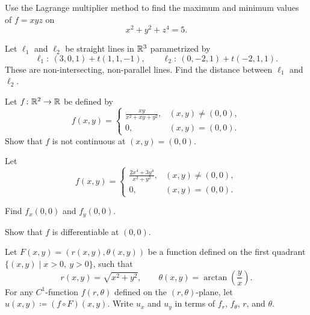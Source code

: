 \begin{problem}
Use the Lagrange multiplier method to find the maximum and minimum values of $f=xyz$ on
\[
x^2+y^2+z^4=5.
\]
\end{problem}

\begin{problem}
Let $\ell_1$ and $\ell_2$ be straight lines in $\mathbb{R}^3$ parametrized by
\[
\ell_1:\ (3, 0, 1)+t(1, 1, -1),
\qquad
\ell_2:\ (0, -2, 1)+t(-2, 1, 1).
\]
These are non-intersecting, non-parallel lines. Find the distance between $\ell_1$ and $\ell_2$.
\end{problem}

\begin{problem}
Let $f\colon\mathbb{R}^2\to\mathbb{R}$ be defined by
\[
f(x, y)=
\begin{cases}
\displaystyle\frac{xy}{x^2+xy+y^2}, & (x, y)\ne(0, 0), \\[0.55em]
0, & (x, y)=(0, 0).
\end{cases}
\]
Show that $f$ is not continuous at $(x, y)=(0, 0)$.
\end{problem}

\begin{problem}
Let
\[
f(x, y)=
\begin{cases}
\displaystyle\frac{2x^4+3y^4}{x^2+y^2}, & (x, y)\ne(0, 0), \\[0.55em]
0, & (x, y)=(0, 0).
\end{cases}
\]
\begin{problemsubparts}
\item Find $f_x(0, 0)$ and $f_y(0, 0)$.
\item Show that $f$ is differentiable at $(0, 0)$.
\end{problemsubparts}
\end{problem}

\begin{problem}
Let $F(x, y)=(r(x, y), \theta(x, y))$ be a function defined on the first quadrant $\{(x, y)\mid x>0,\ y>0\}$, such that
\[
r(x, y)=\sqrt{x^2+y^2},
\qquad
\theta(x, y)=\arctan\!\left(\frac{y}{x}\right).
\]
For any $C^1$-function $f(r, \theta)$ defined on the $(r, \theta)$-plane, let $u(x, y)\coloneqq(f\circ F)(x, y)$.
Write $u_x$ and $u_y$ in terms of $f_r$, $f_\theta$, $r$, and $\theta$.
\end{problem}


